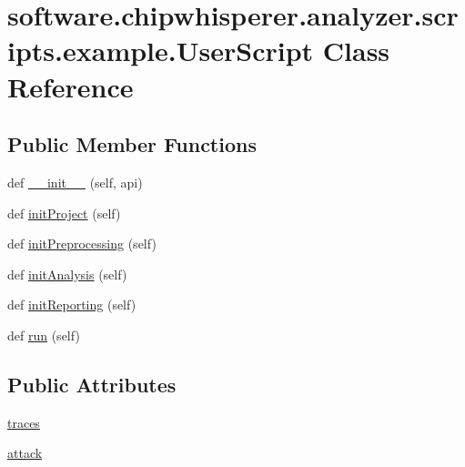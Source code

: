 \hypertarget{classsoftware_1_1chipwhisperer_1_1analyzer_1_1scripts_1_1example_1_1UserScript}{}\section{software.\+chipwhisperer.\+analyzer.\+scripts.\+example.\+User\+Script Class Reference}
\label{classsoftware_1_1chipwhisperer_1_1analyzer_1_1scripts_1_1example_1_1UserScript}
\subsection*{Public Member Functions}
\begin{DoxyCompactItemize}
\item 
def \hyperlink{classsoftware_1_1chipwhisperer_1_1analyzer_1_1scripts_1_1example_1_1UserScript_a625f79110081f9666b8ba03bf9a18e59}{\+\_\+\+\_\+init\+\_\+\+\_\+} (self, api)
\item 
def \hyperlink{classsoftware_1_1chipwhisperer_1_1analyzer_1_1scripts_1_1example_1_1UserScript_a0de26447f0478a81520d017bf8843828}{init\+Project} (self)
\item 
def \hyperlink{classsoftware_1_1chipwhisperer_1_1analyzer_1_1scripts_1_1example_1_1UserScript_ad5380a7bcb0ac08ce1f361d9d661a376}{init\+Preprocessing} (self)
\item 
def \hyperlink{classsoftware_1_1chipwhisperer_1_1analyzer_1_1scripts_1_1example_1_1UserScript_af38f316c1c6ab2e6c4d71b5176460cd8}{init\+Analysis} (self)
\item 
def \hyperlink{classsoftware_1_1chipwhisperer_1_1analyzer_1_1scripts_1_1example_1_1UserScript_a41acf2f33302c1c9087c669504e2c376}{init\+Reporting} (self)
\item 
def \hyperlink{classsoftware_1_1chipwhisperer_1_1analyzer_1_1scripts_1_1example_1_1UserScript_a3629fceb013b9b8da0aa0b2ed62541b4}{run} (self)
\end{DoxyCompactItemize}
\subsection*{Public Attributes}
\begin{DoxyCompactItemize}
\item 
\hyperlink{classsoftware_1_1chipwhisperer_1_1analyzer_1_1scripts_1_1example_1_1UserScript_a761fb48330c3749e0e21993ad08760ff}{traces}
\item 
\hyperlink{classsoftware_1_1chipwhisperer_1_1analyzer_1_1scripts_1_1example_1_1UserScript_a1468c5c88d18d1ff06457be5bcdea8eb}{attack}
\end{DoxyCompactItemize}


